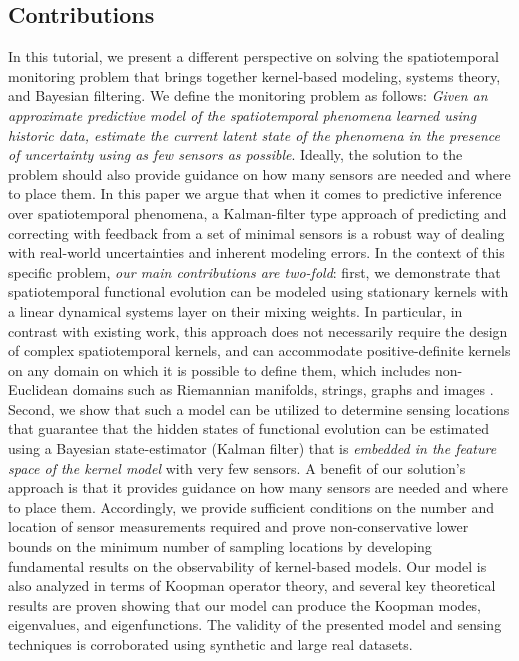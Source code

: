 \subsection{Contributions}
In this tutorial, we present a different perspective on solving the spatiotemporal monitoring problem that brings together kernel-based modeling, systems theory, and Bayesian filtering. We define the monitoring problem as follows: \textit{Given an approximate predictive model of the spatiotemporal phenomena learned using historic data, estimate the current latent state of the phenomena in the presence of uncertainty using as few sensors as possible}. Ideally, the solution to the problem should also provide guidance on how many sensors are needed and where to place them. In this paper we argue that when it comes to predictive inference over spatiotemporal phenomena, a Kalman-filter type approach of predicting and correcting with feedback from a set of minimal sensors is a robust way of dealing with real-world uncertainties and inherent modeling errors.  In the context of this specific problem, \textit{our main contributions are two-fold}: first, we demonstrate that spatiotemporal functional evolution can be modeled using stationary kernels with a linear dynamical systems layer on their mixing weights. In particular, in contrast with existing work, this approach does not necessarily require the design of complex spatiotemporal kernels, and can accommodate positive-definite kernels on any domain on which it is possible to define them, which includes non-Euclidean domains such as Riemannian manifolds, strings, graphs and images \cite{Jayasumana_PAMI2015_RBFs}. Second, we show that such a model can be utilized to determine sensing locations that guarantee that the hidden states of functional evolution can be estimated using a Bayesian state-estimator (Kalman filter) that is \textit{embedded in the feature space of the kernel model} with very few sensors. A benefit of our solution's approach is that it provides guidance on how many sensors are needed and where to place them. Accordingly, we provide sufficient conditions on the number and location of sensor measurements required and prove non-conservative lower bounds on the minimum number of sampling locations by developing fundamental results on the observability of kernel-based models. Our model is also analyzed in terms of Koopman operator theory, and several key theoretical results are proven showing that our model can produce the Koopman modes, eigenvalues, and eigenfunctions. 
The validity of the presented model and sensing techniques is corroborated using synthetic and large real datasets. 

